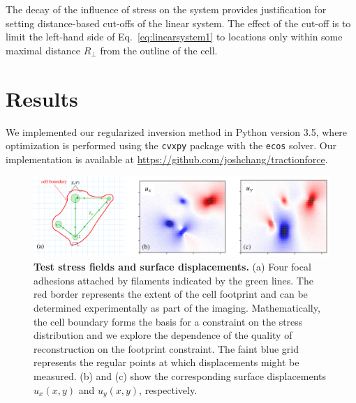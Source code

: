 \documentclass[aps,prl,reprint,twocolumn,groupedaddress,showpacs]{revtex4}
\newcommand{\bsigma}{{\boldsymbol\sigma}}
\def\r{{\bf r}}
\begin{document}
The decay of the influence of stress on the system provides
justification for setting distance-based cut-offs of the linear
system. The effect of the cut-off is to limit the left-hand side of
Eq.~\ref{eq:linearsystem1} to locations only within some maximal
distance $R_{\perp}$ from the outline of the cell.




\section{Results}

We implemented our regularized inversion method in Python version 3.5,
where optimization is performed using the \texttt{cvxpy} package with
the \texttt{ecos} solver.  Our implementation is available at
\url{https://github.com/joshchang/tractionforce}. 

\begin{figure}[ht]
\begin{center}
\includegraphics[width=5.2in]{4-pad.pdf}
%
\caption{\textbf{Test stress fields and surface displacements.} (a)
  Four focal adhesions attached by filaments indicated by the green
  lines. The red border represents the extent of the cell footprint
  and can be determined experimentally as part of the imaging.
  Mathematically, the cell boundary forms the basis for a constraint
  on the stress distribution and we explore the dependence of the
  quality of reconstruction on the footprint constraint. The faint
  blue grid represents the regular points at which displacements might
  be measured. (b) and (c) show the corresponding surface
  displacements $u_{x}(x,y)$ and $u_{y}(x,y)$,
  respectively.\label{TEST}}
\end{center}
\end{figure}
%
\end{document}
